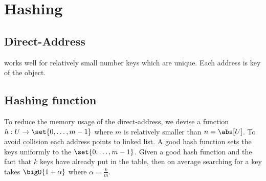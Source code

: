 \chapter{Hashing}
\section{Direct-Address}
works well for relatively small number keys which are unique. Each address is key of the object.
\section{Hashing function}
To reduce the memory usage of the direct-address, we devise a function \(h : U \to \set{0,\dots, m-1}\) where \(m\) is relatively smaller than \(n =\abs[U]\). To avoid collision each address points to linked list. A good hash function sets the keys uniformly to the \(\set{0, \dots, m-1}\). Given a good hash function and the fact that \(k\) keys have already put in the table, then on average searching for a key takes \(\bigO{1 + \alpha}\) where  \(\alpha = \frac{k}{m}\).